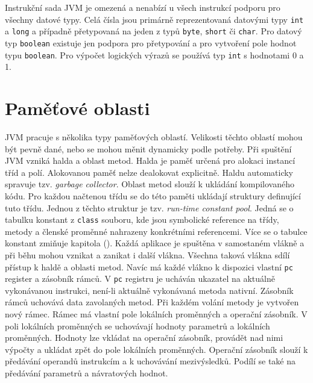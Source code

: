 


Instrukční sada JVM je omezená a nenabízí u všech instrukcí podporu pro všechny datové typy. Celá čísla jsou primárně reprezentovaná datovými typy \texttt{int} a \texttt{long} a případně přetypovaná na jeden z typů \texttt{byte}, \texttt{short} či \texttt{char}. Pro datový typ \texttt{boolean} existuje jen podpora pro přetypování a pro vytvoření pole hodnot typu \texttt{boolean}. Pro výpočet logických výrazů se používá typ \texttt{int} s hodnotami 0 a 1.


\section{Paměťové oblasti}



JVM pracuje s několika typy paměťových oblastí. Velikosti těchto oblastí mohou být pevně dané, nebo se mohou měnit dynamicky podle potřeby. Při spuštění JVM vzniká halda a oblast metod. Halda je paměť určená pro alokaci instancí tříd a polí. Alokovanou paměť nelze dealokovat explicitně. Haldu automaticky spravuje tzv. \textit{garbage collector}. Oblast metod slouží k ukládání kompilovaného kódu. Pro každou načtenou třídu se do této paměti ukládají struktury definující tuto třídu. Jednou z těchto struktur je tzv. \textit{run-time constant pool}. Jedná se o tabulku konstant z \texttt{class} souboru, kde jsou symbolické reference na třídy, metody a členské proměnné nahrazeny konkrétními referencemi. Více se o tabulce konstant zmiňuje kapitola (). Každá aplikace je spuštěna v samostaném vlákně a při běhu mohou vznikat a zanikat i další vlákna. Všechna taková vlákna sdílí přístup k haldě a oblasti metod. Navíc má každé vlákno k dispozici vlastní \texttt{pc} register a zásobník rámců. V \texttt{pc} registru je ucháván ukazatel na aktuálně vykonávanou instrukci, není-li aktuálně vykonávaná metoda nativní. Zásobník rámců uchovává data zavolaných metod. Při každém volání metody je vytvořen nový rámec. Rámec má vlastní pole lokálních proměnných a operační zásobník. V poli lokálních proměnných se uchovávají hodnoty parametrů a lokálních proměnných. Hodnoty lze vkládat na operační zásobník, provádět nad nimi výpočty a ukládat zpět do pole lokálních proměnných. Operační zásobník slouží k předávání operandů instrukcím a k uchovávání mezivýsledků. Podílí se také na předávání parametrů a návratových hodnot.

